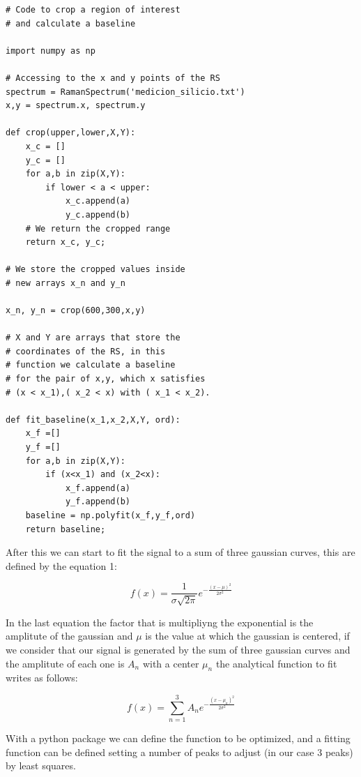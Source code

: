 \documentclass[a4paper,10pt,twocolumn]{article}
\begin{document}
\begin{lstlisting}[basicstyle=\fontsize{5}{4}\selectfont\ttfamily]
# Code to crop a region of interest
# and calculate a baseline

import numpy as np

# Accessing to the x and y points of the RS
spectrum = RamanSpectrum('medicion_silicio.txt')
x,y = spectrum.x, spectrum.y

def crop(upper,lower,X,Y):
    x_c = []
    y_c = []
    for a,b in zip(X,Y):
        if lower < a < upper:
            x_c.append(a)
            y_c.append(b)
    # We return the cropped range
    return x_c, y_c;

# We store the cropped values inside
# new arrays x_n and y_n

x_n, y_n = crop(600,300,x,y)

# X and Y are arrays that store the
# coordinates of the RS, in this
# function we calculate a baseline
# for the pair of x,y, which x satisfies
# (x < x_1),( x_2 < x) with ( x_1 < x_2).

def fit_baseline(x_1,x_2,X,Y, ord):
    x_f =[]
    y_f =[]
    for a,b in zip(X,Y):
        if (x<x_1) and (x_2<x):
            x_f.append(a)
            y_f.append(b)
    baseline = np.polyfit(x_f,y_f,ord)
    return baseline;

\end{lstlisting}

After this we can start to fit the signal to a sum of three gaussian curves, this are defined by the equation 1:

\begin{equation}
f(x) = \frac{1}{\sigma \sqrt{2\pi}} e^{-\frac{(x - \mu)^2}{2\sigma^2}}
\end{equation}

In the last equation the factor that is multipliyng the exponential is the amplitute of the gaussian and  $\mu$ is the value at which the gaussian is centered, if we consider that our signal is generated by the sum of three gaussian curves and the amplitute of each one is $A_{n}$ with a center $\mu_{n}$ the analytical function to fit writes as follows:

\begin{equation}
f(x) = \sum_{n = 1}^{3} A_{n} e^{-\frac{(x - \mu_{n})^2}{2\sigma^2}}
\end{equation}

With a python package we can define the function to be optimized, and a fitting function can be defined setting a number of peaks to adjust (in our case 3 peaks) by least squares.
\end{document}
